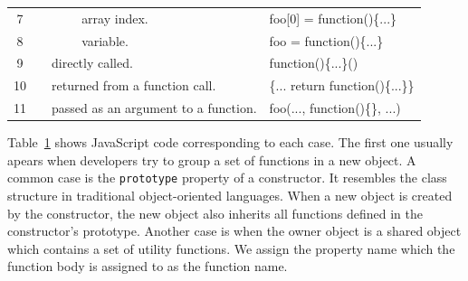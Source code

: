 \documentclass{acm_proc_article-sp}
\begin{document}
\begin{table}
{\begin{tabular}{ | c | l | l | l | m{2.5cm} | l|}
   7 &
   &
   & \multicolumn{2}{|l|}{
      array index.}
   & foo[0] = function()\{...\} \\
   \cline{0-0}\cline{4-6} 

   8 &
   & 
   & \multicolumn{2}{|l|}{
      variable.}
   & foo = function()\{...\} \\
   \cline{0-0}\cline{3-6} 
   
   9 &
   & \multicolumn{3}{|m{3.8cm}|}{
     \raggedright directly called.}
   & function()\{...\}() \\
   \cline{0-0}\cline{3-6} 

   10 &
   & \multicolumn{3}{|m{3.5cm}|}{
     \raggedright returned from a function call.}
   & \{... return function()\{...\}\} \\
   \cline{0-0}\cline{3-6} 

   11 &
   & \multicolumn{3}{|m{3.5cm}|}{
     \raggedright passed as an argument to a function.}
   & foo(..., function()\{\}, ...) \\
   \hline 

  \end{tabular}
  }
 \label{function-types} 
\end{table}

Table~\ref{function-types} shows JavaScript code corresponding to each case. The first one usually apears when developers try to group a set of functions in a new object. A common case is the {\small\texttt{prototype}} property of a constructor. It resembles the class structure in traditional object-oriented languages. When a new object is created by the constructor, the new object also inherits all functions defined in the constructor's prototype. Another case is when the owner object is a shared object which contains a set of utility functions. We assign the property name which the function body is assigned to as the function name.
\end{document}

